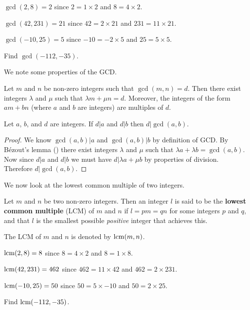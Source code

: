 \begin{example}
    $\gcd(2, 8) = 2$ since $2 = 1 \times 2$ and $8 = 4 \times 2$.
\end{example}
\begin{example}
    $\gcd(42, 231) = 21$ since $42 = 2 \times 21$ and $231 = 11 \times 21$.
\end{example}
\begin{example}
    $\gcd(-10, 25) = 5$ since $-10 = -2 \times 5$ and $25 = 5 \times 5$.
\end{example}
\begin{exercise}
    Find $\gcd(-112, -35)$.
\end{exercise}

We note some properties of the GCD.
\begin{lemma}[B\'{e}zout]\label{lemma-bezout}
    Let $m$ and $n$ be non-zero integers such that $\gcd(m, n) = d$. Then there exist integers $\lambda$ and $\mu$ such that $\lambda m + \mu n = d$. Moreover, the integers of the form $am + bn$ (where $a$ and $b$ are integers) are multiples of $d$.
\end{lemma}

\begin{proposition}\label{prop-gcd-divides-common-divisor}
    Let $a$, $b$, and $d$ are integers. If $d \vert a$ and $d \vert b$ then $d \vert \gcd(a, b)$.
\end{proposition}
\begin{proof}
    We know $\gcd(a,b) \vert a$ and $\gcd(a,b) \vert b$ by definition of GCD. By B\'{e}zout's lemma () there exist integers $\lambda$ and $\mu$ such that $\lambda a + \lambda b = \gcd(a,b)$. Now since $d \vert a$ and $d \vert b$ we must have $d \vert \lambda a + \mu b$ by properties of division. Therefore $d \vert \gcd(a,b)$.
\end{proof}

We now look at the lowest common multiple of two integers.
\begin{definition}
    Let $m$ and $n$ be two non-zero integers. Then an integer $l$ is said to be the \textbf{lowest common multiple} (LCM) of $m$ and $n$ if $l = pm = qn$ for some integers $p$ and $q$, and that $l$ is the smallest possible \textit{positive} integer that achieves this.

    The LCM of $m$ and $n$ is denoted by $\mathrm{lcm}(m,n)$.
\end{definition}

\begin{example}
    $\mathrm{lcm}(2, 8) = 8$ since $8 = 4 \times 2$ and $8 = 1 \times 8$.
\end{example}
\begin{example}
    $\mathrm{lcm}(42, 231) = 462$ since $462 = 11 \times 42$ and $462 = 2 \times 231$.
\end{example}
\begin{example}
    $\mathrm{lcm}(-10, 25) = 50$ since $50 = 5 \times -10$ and $50 = 2 \times 25$.
\end{example}
\begin{exercise}
    Find $\mathrm{lcm}(-112, -35)$.
\end{exercise}

